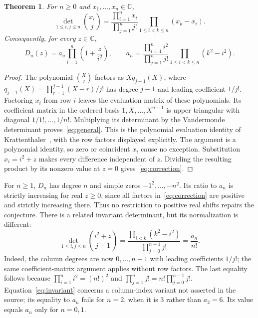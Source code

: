 \documentclass[11pt]{article}
\newtheorem{theorem}{Theorem}
\newcommand{\C}{\mathbb C}
\begin{document}
\begin{theorem}\label{thm:main}
For $n\ge0$ and $x_1,\ldots,x_n\in\C$,
\begin{equation}\label{eq:general}
 \det_{1\le i,j\le n}\binom{x_i}{j}
 =\frac{\prod_{i=1}^n x_i}{\prod_{j=1}^n j!}
   \prod_{1\le i<k\le n}(x_k-x_i).
\end{equation}
Consequently, for every $z\in\C$,
\begin{equation}\label{eq:correction}
 D_n(z)=a_n\prod_{i=1}^n\left(1+\frac{z}{i^2}\right),\qquad
 a_n=\frac{\prod_{i=1}^n i^2}{\prod_{j=1}^n j!}
             \prod_{1\le i<k\le n}(k^2-i^2).
\end{equation}
\end{theorem}
\begin{proof}
The polynomial $\binom{X}{j}$ factors as $Xq_{j-1}(X)$, where
$q_{j-1}(X)=\prod_{r=1}^{j-1}(X-r)/j!$ has degree $j-1$ and leading
coefficient $1/j!$. Factoring $x_i$ from row $i$ leaves the evaluation
matrix of these polynomials. Its coefficient matrix in the ordered basis
$1,X,\ldots,X^{n-1}$ is upper triangular with diagonal
$1/1!,\ldots,1/n!$. Multiplying its determinant by the Vandermonde
determinant proves~\eqref{eq:general}. This is the polynomial evaluation
identity of Krattenthaler~\cite[Proposition 1, equation (2.2)]{kratt},
with the row factors displayed explicitly. The argument is a polynomial
identity, so zero or coincident $x_i$ cause no exception. Substitution
$x_i=i^2+z$ makes every difference independent of $z$. Dividing the resulting
product by its nonzero value at $z=0$ gives~\eqref{eq:correction}.
\end{proof}

For $n\ge1$, $D_n$ has degree $n$ and simple zeros $-1^2,\ldots,-n^2$.
Its ratio to $a_n$ is strictly increasing for real $z\ge0$, since all factors
in~\eqref{eq:correction} are positive and strictly increasing there.
Thus no restriction to positive real shifts repairs the conjecture.
There is a related invariant determinant, but its normalization is different:
\begin{equation}\label{eq:invariant}
 \det_{1\le i,j\le n}\binom{i^2+z}{j-1}
 =\frac{\prod_{i<k}(k^2-i^2)}{\prod_{j=0}^{n-1}j!}
 =\frac{a_n}{n!}.
\end{equation}
Indeed, the column degrees are now $0,\ldots,n-1$ with leading coefficients
$1/j!$; the same coefficient-matrix argument applies without row factors.
The last equality follows because
$\prod_{i=1}^n i^2=(n!)^2$ and
$\prod_{j=1}^n j!=n!\prod_{j=0}^{n-1}j!$.
Equation~\eqref{eq:invariant} concerns a column-index variant not asserted
in the source; its equality to $a_n$ fails for $n=2$, when it is $3$ rather
than $a_2=6$. Its value equals $a_n$ only for $n=0,1$.
\end{document}

